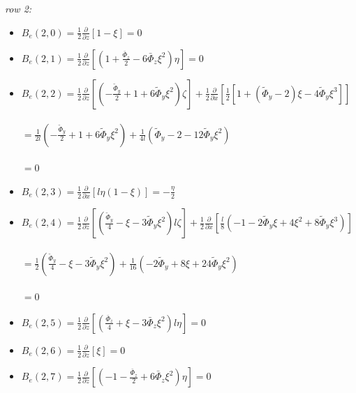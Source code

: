 \documentclass[a4paper,11pt]{article}
\newcommand{\gr}{\textbf}
\begin{document}
\noindent \textit{row 2:}
\begin{itemize}[label=$\gr{-}$, font=\LARGE, font=\color{color1}, topsep = 0.2cm, itemsep=0.2cm]
	\item $B_e(2,0) = \frac{1}{2} \frac{\partial}{\partial z} \left[ 1 - \xi \right] = 0 $
	\item $B_e(2,1) = \frac{1}{2} \frac{\partial}{\partial z} \left[ \left( 1 + \frac{\bar{\Phi}_z}{2} - 6 \bar{\Phi}_z \xi^2 \right) \eta \right] = 0$
	\item $B_e(2,2) = \frac{1}{2} \frac{\partial}{\partial z} \left[ \left( -\frac{\tilde{\Phi}_y}{2} + 1 + 6 \tilde{\Phi}_y \xi^2 \right) \zeta \right] + \frac{1}{2} \frac{\partial}{\partial x} \left[ \frac{1}{2} \left[ 1 + (\tilde{\Phi}_y - 2) \xi - 4\tilde{\Phi}_y \xi^3 \right] \right] $
	    \\ \\ \text{\hspace{13mm}} $ = \frac{1}{2l} \left( -\frac{\tilde{\Phi}_y}{2} + 1 + 6 \tilde{\Phi}_y \xi^2 \right) + \frac{1}{4l} \left( \tilde{\Phi}_y - 2  - 12 \tilde{\Phi}_y \xi^2 \right) $
	    \\ \\ \text{\hspace{13mm}} $ = 0$
	\item $B_e(2,3) = \frac{1}{2} \frac{\partial}{\partial x} \left[ l \eta (1 - \xi) \right] = - \frac{\eta}{2} $
	\item $B_e(2,4) = \frac{1}{2} \frac{\partial}{\partial z} \left[ \left( \frac{\tilde{\Phi}_y}{4} - \xi - 3 \tilde{\Phi}_y \xi^2 \right) l \zeta \right] + \frac{1}{2} \frac{\partial}{\partial x} \left[ \frac{l}{8} \left( -1 - 2\tilde{\Phi}_y \xi + 4 \xi^2 + 8\tilde{\Phi}_y \xi^3 \right) \right] $
	    \\ \\ \text{\hspace{13mm}} $ = \frac{1}{2} \left( \frac{\tilde{\Phi}_y}{4} - \xi - 3 \tilde{\Phi}_y \xi^2 \right) + \frac{1}{16} \left( - 2 \tilde{\Phi}_y + 8\xi + 24 \tilde{\Phi}_y \xi^2 \right)$
	    \\ \\ \text{\hspace{13mm}} $ = 0 $
	\item $B_e(2,5) = \frac{1}{2} \frac{\partial}{\partial z} \left[ \left( \frac{\bar{\Phi}_z}{4} + \xi - 3 \bar{\Phi}_z \xi^2 \right) l \eta \right] = 0 $
	\item $B_e(2,6) = \frac{1}{2} \frac{\partial}{\partial z} \left[ \xi \right] = 0 $
	\item $B_e(2,7) = \frac{1}{2} \frac{\partial}{\partial z} \left[ \left( - 1 - \frac{\bar{\Phi}_z}{2} + 6 \bar{\Phi}_z \xi^2 \right) \eta \right] = 0$

\end{itemize}
\end{document}
